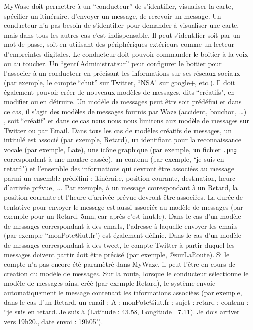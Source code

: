 \documentclass[12pt]{article}
\begin{document}
MyWase doit permettre à un ``conducteur'' de s’identifier, visualiser la carte, spécifier un itinéraire, d’envoyer un message, de recevoir un message.   
Un conducteur n’a pas  besoin de s’identifier pour demander à visualiser une carte, mais dans tous les autres cas  c’est  indispensable.  
Il  peut  s’identifier  soit  par  un  mot  de  passe,  soit  en  utilisant  des  périphériques extérieurs comme un lecteur d’empreintes digitales.  
Le conducteur doit  pouvoir commander le boitier à la voix ou au toucher. 
Un ``gentilAdministrateur'' peut configurer le boitier pour l’associer à un conducteur en  précisant les informations sur ses réseaux sociaux (par exemple, le compte ``chut'' sur Twitter, ``NSA" sur google+, etc.). 
Il doit également pouvoir créer de nouveaux modèles  de messages, dits ``créatifs", en modifier ou en détruire. 
Un modèle de messages peut  être soit prédéfini et dans ce cas, il s’agit des modèles de messages fournis par Waze  (accident,  bouchon, \ldots)  ,  soit  ``créatif"  et  dans ce  cas  nous nous  nous  limitons  aux  modèle de messages sur Twitter ou par Email.   
Dans tous les cas de modèles créatifs de  messages,  un  intitulé   est  associé  (par  exemple,  Retard),  un  identifiant  pour  la  reconnaissance vocale (par exemple, Late), une icône graphique (par  exemple, un  fichier \texttt{.png} correspondant à une montre cassée), un contenu (par exemple, ``je suis en retard") et l’ensemble des informations qui devront être associées au message  parmi  un  ensemble  prédéfini  : itinéraire, position courante, destination, heure d’arrivée prévue,  \ldots{}.
Par  exemple,  à  un  message  correspondant à un Retard, la position courante et l’heure d’arrivée prévue devront être  associées. 
La durée de tentative pour envoyer le message est aussi associée au modèle  de messages (par exemple pour un Retard,  5mn, car après c’est inutile). 
Dans le cas d’un  modèle de messages correspondant à des emails, l’adresse à laquelle envoyer les emails  (par exemple ``monPote@iut.fr")  est également définie. 
Dans le cas d’un modèle de  messages correspondant à des tweet, le compte Twitter à partir duquel les messages  doivent partir doit être précisé (par exemple, @surLaRoute).   
Si le compte n’a pas  encore été paramètré dans MyWaze, il peut l’être en cours de création du modèle de  messages. Sur la route, lorsque le conducteur sélectionne le modèle de messages ainsi créé (par  exemple  Retard),  le  système  envoie  automatiquement  le  message  contenant  les  informations associées (par exemple, dans le cas d’un Retard, un email :  A : monPote@iut.fr ; sujet : retard ;   contenu : ``je suis en retard. Je suis à (Latitude :  43.58, Longitude : 7.11). Je dois arriver vers 19h20., date envoi : 19h05").   
\end{document}
